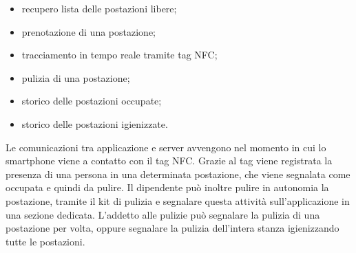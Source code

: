 \begin{itemize}
	\item recupero lista delle postazioni libere; \\
	\item prenotazione di una postazione; \\
	\item tracciamento in tempo reale tramite tag NFC; \\
	\item pulizia di una postazione; \\
	\item storico delle postazioni occupate; \\
	\item storico delle postazioni igienizzate. \\ 
\end{itemize}
Le comunicazioni tra applicazione e server avvengono nel momento in cui lo smartphone viene a contatto con il tag NFC. Grazie al tag viene registrata la presenza di una persona in una determinata postazione, che viene segnalata come occupata e quindi da pulire. Il dipendente può inoltre pulire in autonomia la postazione, tramite il kit di pulizia e segnalare questa attività sull’applicazione in una sezione dedicata.
L’addetto alle pulizie può segnalare la pulizia di una postazione per volta, oppure segnalare la pulizia dell’intera stanza igienizzando tutte le postazioni.

